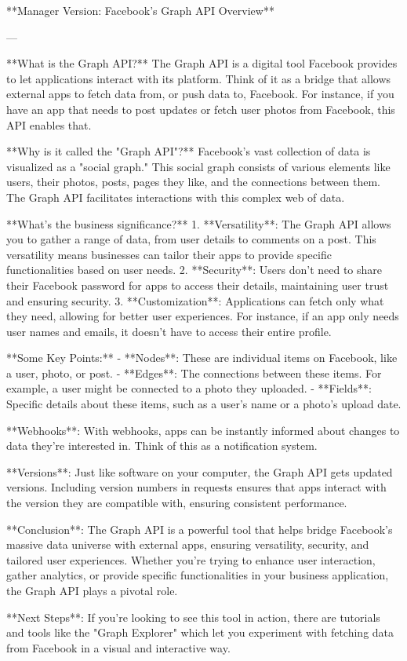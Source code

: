 **Manager Version: Facebook's Graph API Overview**

---

**What is the Graph API?**
The Graph API is a digital tool Facebook provides to let applications interact with its platform. Think of it as a bridge that allows external apps to fetch data from, or push data to, Facebook. For instance, if you have an app that needs to post updates or fetch user photos from Facebook, this API enables that.

**Why is it called the "Graph API"?**
Facebook’s vast collection of data is visualized as a "social graph." This social graph consists of various elements like users, their photos, posts, pages they like, and the connections between them. The Graph API facilitates interactions with this complex web of data.

**What's the business significance?**
1. **Versatility**: The Graph API allows you to gather a range of data, from user details to comments on a post. This versatility means businesses can tailor their apps to provide specific functionalities based on user needs.
2. **Security**: Users don't need to share their Facebook password for apps to access their details, maintaining user trust and ensuring security.
3. **Customization**: Applications can fetch only what they need, allowing for better user experiences. For instance, if an app only needs user names and emails, it doesn’t have to access their entire profile.

**Some Key Points:**
- **Nodes**: These are individual items on Facebook, like a user, photo, or post.
- **Edges**: The connections between these items. For example, a user might be connected to a photo they uploaded.
- **Fields**: Specific details about these items, such as a user’s name or a photo’s upload date.

**Webhooks**: With webhooks, apps can be instantly informed about changes to data they're interested in. Think of this as a notification system.

**Versions**: Just like software on your computer, the Graph API gets updated versions. Including version numbers in requests ensures that apps interact with the version they are compatible with, ensuring consistent performance.

**Conclusion**:
The Graph API is a powerful tool that helps bridge Facebook's massive data universe with external apps, ensuring versatility, security, and tailored user experiences. Whether you're trying to enhance user interaction, gather analytics, or provide specific functionalities in your business application, the Graph API plays a pivotal role.

**Next Steps**: If you're looking to see this tool in action, there are tutorials and tools like the "Graph Explorer" which let you experiment with fetching data from Facebook in a visual and interactive way.